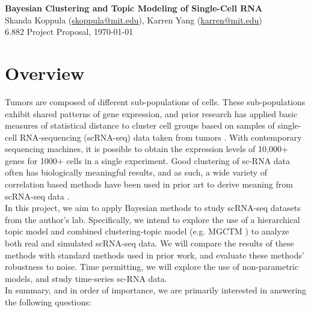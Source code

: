 \documentclass[11pt]{article}
\begin{document}
\begin{centering}
\Large
    \textbf{Bayesian Clustering and Topic Modeling of Single-Cell RNA}  \\
    \vspace{2mm}
    \normalsize
    Skanda Koppula (\url{skoppula@mit.edu}), Karren Yang (\url{karren@mit.edu}) \\
    \vspace{2mm}
    \normalsize
    6.882 Project Proposal, \today \\
\end{centering}
\vspace{5mm}

\section{Overview}

Tumors are composed of different sub-populations of cells. These sub-populations exhibit shared patterns of gene expression, and prior research has applied basic measures of statistical distance to cluster cell groups based on samples of single-cell RNA-sequencing (scRNA-seq) data taken from tumors \cite{nature}. With contemporary sequencing machines, it is possible to obtain the expression levels of 10,000+ genes for 1000+ cells in a single experiment. Good clustering of sc-RNA data often has
biologically meaningful results, and as such, a wide variety of correlation based methods have been used in prior art to derive meaning from scRNA-seq data \cite{coexpression, consensus, profiling}. \\

In this project, we aim to apply Bayesian methods to study scRNA-seq datasets from the author's lab. Specifically, we intend to explore the use of a hierarchical topic model and combined clustering-topic model (e.g. MGCTM \cite{pengtao}) to analyze both real and simulated scRNA-seq data. We will compare the results of these methods with standard methods used in prior work, and evaluate these methods' robustness to noise. Time permitting, we will explore the use of non-parametric models, and study time-series sc-RNA data. \\

In summary, and in order of importance, we are primarily interested in answering the following questions:
\end{document}
